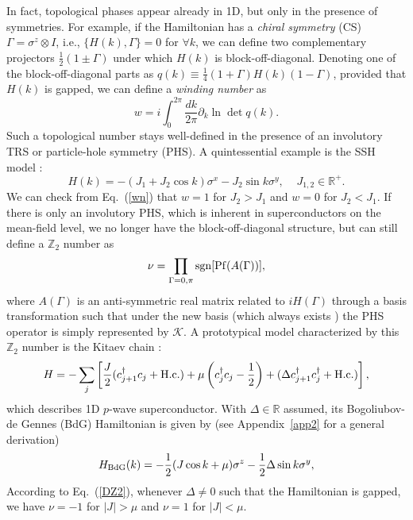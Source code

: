 \documentclass{tADP2e}
\theoremstyle{plain}
\theoremstyle{plain}
\theoremstyle{definition}
\begin{document}
In fact, topological phases appear already in 1D, but only in the presence of symmetries. For example, if the Hamiltonian has a \emph{chiral symmetry} (CS) $\Gamma=\sigma^z\otimes I$, i.e., $\{H(k),\Gamma\}=0$ for $\forall k$, we can define two complementary projectors $\frac{1}{2}(1\pm\Gamma)$ under which $H(k)$ is block-off-diagonal. Denoting one of the block-off-diagonal parts as $q(k)\equiv\frac{1}{4}(1+\Gamma)H(k)(1-\Gamma)$, provided that $H(k)$ is gapped, we can define a \emph{winding number} as \cite{CCK16}
\begin{equation}
w=i\int^{2\pi}_0\frac{dk}{2\pi} \partial_k\ln\det q(k).
\label{wn}
\end{equation}
Such a topological number stays well-defined in the presence of an involutory TRS or particle-hole symmetry (PHS). A quintessential example is the SSH model \cite{SWP79}:
\begin{equation}
H(k)=-(J_1+J_2\cos k)\sigma^x-J_2\sin k\sigma^y,\;\;\;\;J_{1,2}\in\mathbb{R}^+.
\label{SSH}
\end{equation} 
We can check from Eq.~(\ref{wn}) that $w=1$ for $J_2>J_1$ and $w=0$ for $J_2<J_1$. If there is only an involutory PHS, which is inherent in superconductors on the mean-field level, we no longer have the block-off-diagonal structure, but can still define a $\mathbb{Z}_2$ number as \cite{AYK01}
\begin{equation}
\nu=\prod_{\Gamma=0,\pi}{\rm sgn}[{\rm Pf}(A(\Gamma))],
\label{DZ2}
\end{equation}
where $A(\Gamma)$ is an anti-symmetric real matrix related to $iH(\Gamma)$ through a basis transformation such that under the new basis (which always exists \cite{WE60}) the PHS operator is simply represented by $\mathcal{K}$. A prototypical model characterized by this $\mathbb{Z}_2$ number is the Kitaev chain \cite{AYK01}:
\begin{equation}
H=-\sum_j\left[\frac{J}{2}(c_{j+1}^\dag c_j+{\rm H.c.})+\mu\left(c_j^\dag c_j-\frac{1}{2}\right)+(\Delta c^\dag_{j+1}c^\dag_j+{\rm H.c.})\right],
\end{equation}
which describes 1D $p$-wave superconductor. With $\Delta\in\mathbb{R}$ assumed, its Bogoliubov-de Gennes (BdG) Hamiltonian is given by (see Appendix~\ref{app2} for a general derivation)
\begin{equation}
H_{\rm BdG}(k)=-\frac{1}{2}(J\cos k+\mu)\sigma^z-\frac{1}{2}\Delta\sin k\sigma^y,
\end{equation}
According to Eq.~(\ref{DZ2}), whenever $\Delta\neq0$ such that the Hamiltonian is gapped, we have $\nu=-1$ for $|J|>\mu$ and $\nu=1$ for $|J|<\mu$.
\end{document}
